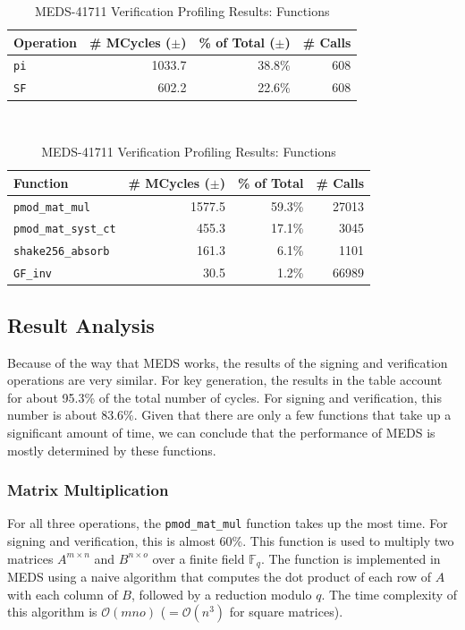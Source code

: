 \documentclass[11pt,a4paper]{report}
\begin{document}
\begin{table}[]
  \centering
  \begin{tabular}{lrrr}
    \toprule
    \textbf{Operation} & \textbf{\# MCycles} ($\pm$) & \textbf{\% of Total} ($\pm$) & \textbf{\# Calls} \\
    \midrule
    \texttt{pi} & 1033.7 & 38.8\% & 608 \\
    \texttt{SF} & 602.2 & 22.6\% & 608 \\
    \bottomrule
  \end{tabular}
  \caption{MEDS-41711 Verification Profiling Results: Operations}
  \label{tab:medsverificationoperations}
  ~\\
  \begin{tabular}{lrrr}
    \toprule
    \textbf{Function} & \textbf{\# MCycles} ($\pm$) & \textbf{\% of Total} & \textbf{\# Calls} \\
    \midrule
    \texttt{pmod\_mat\_mul} & 1577.5 & 59.3\% & 27013 \\
    \texttt{pmod\_mat\_syst\_ct} & 455.3 & 17.1\% & 3045 \\
    \texttt{shake256\_absorb} & 161.3 & 6.1\% & 1101 \\
    \texttt{GF\_inv} & 30.5 & 1.2\% & 66989 \\
    \bottomrule
  \end{tabular}
  \caption{MEDS-41711 Verification Profiling Results: Functions}
  \label{tab:medsverificationfunctions}
\end{table}

\subsection{Result Analysis}
Because of the way that MEDS works, the results of the signing and verification operations are very similar. For key generation, the results in the table account for about 95.3\% of the total number of cycles. For signing and verification, this number is about 83.6\%. Given that there are only a few functions that take up a significant amount of time, we can conclude that the performance of MEDS is mostly determined by these functions.

\subsubsection{Matrix Multiplication}
For all three operations, the \texttt{pmod\_mat\_mul} function takes up the most time. For signing and verification, this is almost 60\%. This function is used to multiply two matrices $A^{m \times n}$ and $B^{n \times o}$ over a finite field $\mathbb{F}_q$. The function is implemented in MEDS using a naive algorithm that computes the dot product of each row of $A$ with each column of $B$, followed by a reduction modulo $q$. The time complexity of this algorithm is $\mathcal{O}(mno)$ ($= \mathcal{O}(n^3)$ for square matrices).
\end{document}
